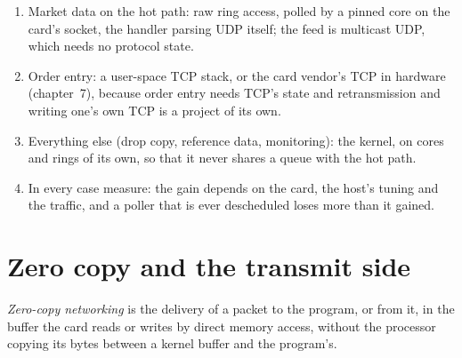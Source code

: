 \begin{method}\label{met:nw:network-cards-and-kernel-bypass:choose}
\begin{enumerate}
\item Market data on the hot path: raw ring access, polled by a pinned core on the card's socket, the handler parsing UDP itself; the
  feed is multicast UDP, which needs no protocol state.
\item Order entry: a user-space TCP stack, or the card vendor's TCP in hardware (chapter~7), because order entry needs TCP's state and
  retransmission and writing one's own TCP is a project of its own.
\item Everything else (drop copy, reference data, monitoring): the kernel, on cores and rings of its own, so that it never shares a
  queue with the hot path.
\item In every case measure: the gain depends on the card, the host's tuning and the traffic, and a poller that is ever descheduled
  loses more than it gained.
\end{enumerate}
\end{method}

\label{lst:nw:network-cards-and-kernel-bypass:ring}

\section{Zero copy and the transmit side}

\begin{definition}\label{def:nw:network-cards-and-kernel-bypass:zerocopy}
\emph{Zero-copy networking} is the delivery of a packet to the program, or from it, in the buffer the card
reads or writes by direct memory access, without the processor copying its bytes between a kernel buffer and the program's.
\end{definition}

